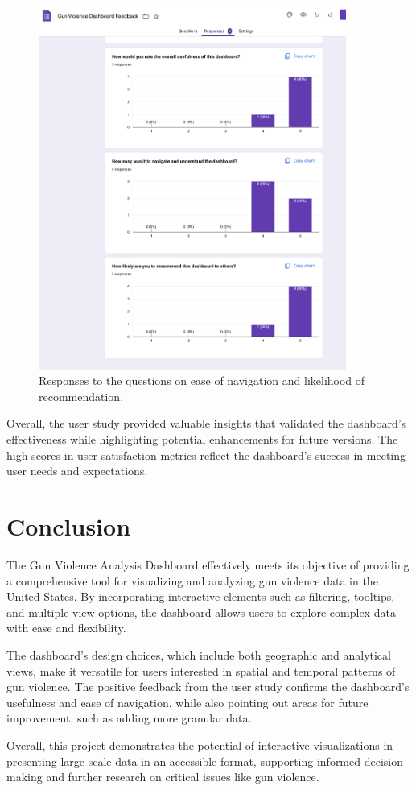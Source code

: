 \documentclass{article}
\begin{document}
\begin{figure}[H]
    \centering
    \includegraphics[width=0.9\textwidth]{GoogleFormResponse2.png}
    \caption{Responses to the questions on ease of navigation and likelihood of recommendation.}
    \label{fig:google_form_response2}
\end{figure}

Overall, the user study provided valuable insights that validated the dashboard’s effectiveness while highlighting potential enhancements for future versions. The high scores in user satisfaction metrics reflect the dashboard’s success in meeting user needs and expectations.

\section{Conclusion}
The Gun Violence Analysis Dashboard effectively meets its objective of providing a comprehensive tool for visualizing and analyzing gun violence data in the United States. By incorporating interactive elements such as filtering, tooltips, and multiple view options, the dashboard allows users to explore complex data with ease and flexibility. 

The dashboard’s design choices, which include both geographic and analytical views, make it versatile for users interested in spatial and temporal patterns of gun violence. The positive feedback from the user study confirms the dashboard’s usefulness and ease of navigation, while also pointing out areas for future improvement, such as adding more granular data.

Overall, this project demonstrates the potential of interactive visualizations in presenting large-scale data in an accessible format, supporting informed decision-making and further research on critical issues like gun violence.
\end{document}
